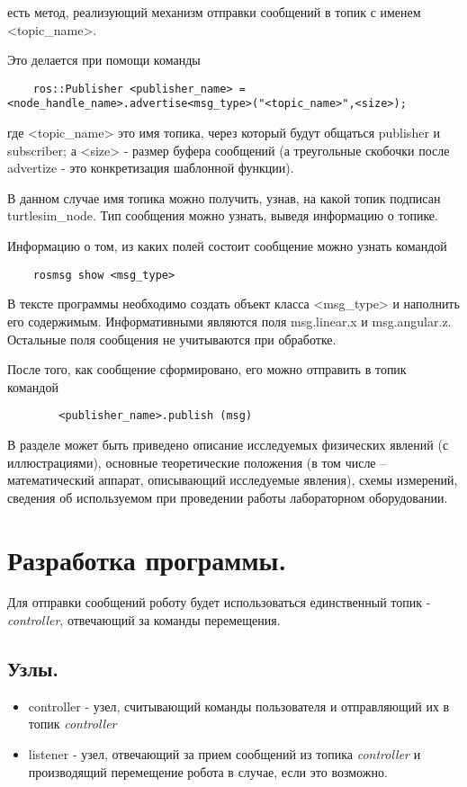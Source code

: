 \documentclass[14pt, a4paper]{extarticle}
\begin{document}
	есть метод, реализующий механизм отправки сообщений в топик с именем <topic\_name>.
	
	Это делается при помощи команды
	
	\begin{lstlisting}
	ros::Publisher <publisher_name> = <node_handle_name>.advertise<msg_type>("<topic_name>",<size>);
	\end{lstlisting}
	
	где <topic\_name> это имя топика, через который будут общаться publisher и subscriber; а <size> - размер буфера сообщений (а треугольные скобочки после advertize - это конкретизация шаблонной функции).
	
	В данном случае имя топика можно получить, узнав, на какой топик подписан turtlesim\_node. Тип сообщения можно узнать, выведя информацию о топике.
	
	Информацию о том, из каких полей состоит сообщение можно узнать командой
	
	\begin{lstlisting}
	rosmsg show <msg_type>	
	\end{lstlisting}
	
	В тексте программы необходимо создать объект класса <msg\_type> и наполнить его содержимым. Информативными являются поля msg.linear.x и msg.angular.z. Остальные поля сообщения не учитываются при обработке.
	
	После того, как сообщение сформировано, его можно отправить в топик командой 	
	\begin{lstlisting}
		<publisher_name>.publish (msg)	
	\end{lstlisting}
		
	В разделе может быть приведено описание исследуемых физических явлений (с иллюстрациями), основные теоретические положения (в том числе – математический аппарат, описывающий исследуемые явления), схемы измерений, сведения об используемом при проведении работы лабораторном оборудовании.

	\section{Разработка программы.}
	Для отправки сообщений роботу будет использоваться единственный топик - \textit{controller}, отвечающий за команды перемещения.
	
	\subsection{Узлы.}
	\begin{itemize}
	\item controller - узел, считывающий команды пользователя и отправляющий их в топик \textit{controller}
	\item listener - узел, отвечающий за прием сообщений из топика \textit{controller} и производящий перемещение робота в случае, если это возможно.
	\end{itemize}
\end{document}
